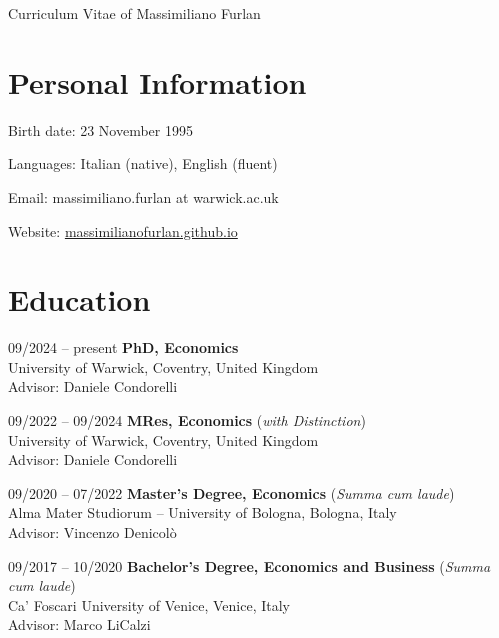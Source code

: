 \documentclass[11pt,a4paper]{article}
\begin{document}
\date{}
\thispagestyle{empty}
\setlength\cvlabelwidth{90pt}

\begin{cv}{\LARGE Curriculum Vitae of Massimiliano Furlan}

\section{Personal Information}

\begin{cvlist}{}
	\itemsep -4pt
	\item[Birth date:] 23 November 1995
	\item[Languages:] Italian (native), English (fluent)
	\item[Email:] massimiliano.furlan at warwick.ac.uk
	\item[Website:] \href{https://massimilianofurlan.github.io}{massimilianofurlan.github.io}
\end{cvlist}
\vspace{-20pt}

\section{Education}

\begin{cvlist}{}
    \item[09/2024 -- present] \textbf{PhD, Economics}\\
         University of Warwick, Coventry, United Kingdom\\
         Advisor: Daniele Condorelli
	\item[09/2022 -- 09/2024] \textbf{MRes, Economics} (\textit{with Distinction})\\ 
		University of Warwick, Coventry, United Kingdom\\
		Advisor: Daniele Condorelli
	\item[09/2020 -- 07/2022] \textbf{Master's Degree, Economics} (\textit{Summa cum laude})\\ 
		Alma Mater Studiorum -- University of Bologna, Bologna, Italy\\
		Advisor: Vincenzo Denicolò
	\item[09/2017 -- 10/2020] \textbf{Bachelor's Degree, Economics and Business} (\textit{Summa cum laude}) \\
		Ca' Foscari University of Venice, Venice, Italy\\
		Advisor: Marco LiCalzi
\end{cvlist}
\vspace{-15pt}


\end{cv}
\end{document}
